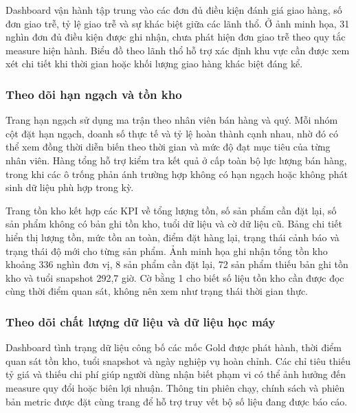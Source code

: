 
Dashboard vận hành tập trung vào các đơn đủ điều kiện đánh giá giao hàng, số đơn giao trễ, tỷ lệ giao trễ và sự khác biệt giữa các lãnh thổ. Ở ảnh minh họa, 31 nghìn đơn đủ điều kiện được ghi nhận, chưa phát hiện đơn giao trễ theo quy tắc measure hiện hành. Biểu đồ theo lãnh thổ hỗ trợ xác định khu vực cần được xem xét chi tiết khi thời gian hoặc khối lượng giao hàng khác biệt đáng kể.


\subsubsection{Theo dõi hạn ngạch và tồn kho}

Trang hạn ngạch sử dụng ma trận theo nhân viên bán hàng và quý. Mỗi nhóm cột đặt hạn ngạch, doanh số thực tế và tỷ lệ hoàn thành cạnh nhau, nhờ đó có thể xem đồng thời diễn biến theo thời gian và mức độ đạt mục tiêu của từng nhân viên. Hàng tổng hỗ trợ kiểm tra kết quả ở cấp toàn bộ lực lượng bán hàng, trong khi các ô trống phản ánh trường hợp không có hạn ngạch hoặc không phát sinh dữ liệu phù hợp trong kỳ.


Trang tồn kho kết hợp các KPI về tổng lượng tồn, số sản phẩm cần đặt lại, số sản phẩm không có bản ghi tồn kho, tuổi dữ liệu và cờ dữ liệu cũ. Bảng chi tiết hiển thị lượng tồn, mức tồn an toàn, điểm đặt hàng lại, trạng thái cảnh báo và trạng thái độ mới cho từng sản phẩm. Ảnh minh họa ghi nhận tổng tồn kho khoảng 336 nghìn đơn vị, 8 sản phẩm cần đặt lại, 72 sản phẩm thiếu bản ghi tồn kho và tuổi snapshot 292,7 giờ. Cờ  bằng 1 cho biết số liệu tồn kho cần được đọc cùng thời điểm quan sát, không nên xem như trạng thái thời gian thực.


\subsubsection{Theo dõi chất lượng dữ liệu và dữ liệu học máy}

Dashboard tình trạng dữ liệu công bố các mốc Gold được phát hành, thời điểm quan sát tồn kho, tuổi snapshot và ngày nghiệp vụ hoàn chỉnh. Các chỉ tiêu thiếu tỷ giá và thiếu chi phí giúp người dùng nhận biết phạm vi có thể ảnh hưởng đến measure quy đổi hoặc biên lợi nhuận. Thông tin phiên chạy, chính sách và phiên bản metric được đặt cùng trang để hỗ trợ truy vết bộ số liệu đang được báo cáo.

